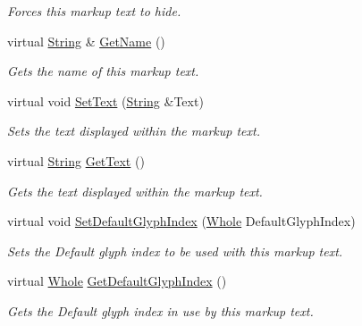 \begin{DoxyCompactItemize}
\begin{DoxyCompactList}\small\item\em Forces this markup text to hide. \item\end{DoxyCompactList}\item 
virtual \hyperlink{namespacephys_aa03900411993de7fbfec4789bc1d392e}{String} \& \hyperlink{classphys_1_1UI_1_1MarkupText_afa64067f890466ad4844c4836e7667fd}{GetName} ()
\begin{DoxyCompactList}\small\item\em Gets the name of this markup text. \item\end{DoxyCompactList}\item 
virtual void \hyperlink{classphys_1_1UI_1_1MarkupText_af5d9184959b56996e9727e2d7ccf8f22}{SetText} (\hyperlink{namespacephys_aa03900411993de7fbfec4789bc1d392e}{String} \&Text)
\begin{DoxyCompactList}\small\item\em Sets the text displayed within the markup text. \item\end{DoxyCompactList}\item 
virtual \hyperlink{namespacephys_aa03900411993de7fbfec4789bc1d392e}{String} \hyperlink{classphys_1_1UI_1_1MarkupText_af5d8a7e6ca03e15fc488608c28a54c1e}{GetText} ()
\begin{DoxyCompactList}\small\item\em Gets the text displayed within the markup text. \item\end{DoxyCompactList}\item 
virtual void \hyperlink{classphys_1_1UI_1_1MarkupText_a6e12c59a15a110b74e8cf725cac82a29}{SetDefaultGlyphIndex} (\hyperlink{namespacephys_a460f6bc24c8dd347b05e0366ae34f34a}{Whole} DefaultGlyphIndex)
\begin{DoxyCompactList}\small\item\em Sets the Default glyph index to be used with this markup text. \item\end{DoxyCompactList}\item 
virtual \hyperlink{namespacephys_a460f6bc24c8dd347b05e0366ae34f34a}{Whole} \hyperlink{classphys_1_1UI_1_1MarkupText_a02872d0b9828b34e9b2ceec82cce237b}{GetDefaultGlyphIndex} ()
\begin{DoxyCompactList}\small\item\em Gets the Default glyph index in use by this markup text. \item\end{DoxyCompactList}\item 

\end{DoxyCompactItemize}
